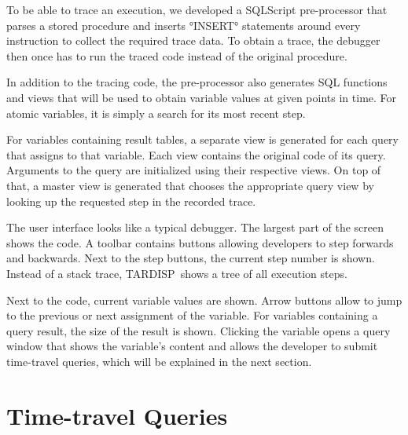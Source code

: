 \documentclass[english]{sig-alternate-05-2015}
\newcommand{\todo}[2][]{\pdfmargincomment[author={#1}]{#2}}
\newcommand{\tool}{TARDISP}
\begin{document}
To be able to trace an execution, we developed a SQLScript pre-processor that parses a stored procedure and inserts °INSERT° statements around every instruction to collect the required trace data.
To obtain a trace, the debugger then once has to run the traced code instead of the original procedure.

In addition to the tracing code, the pre-processor also generates SQL functions and views that will be used to obtain variable values at given points in time.
For atomic variables, it is simply a search for its most recent step.

For variables containing result tables, a separate view is generated for each query that assigns to that variable.
Each view contains the original code of its query.
Arguments to the query are initialized using their respective views.
On top of that, a master view is generated that chooses the appropriate query view by looking up the requested step in the recorded trace.
\todo{AT: How much detail?}

The user interface looks like a typical debugger.
The largest part of the screen shows the code.
A toolbar contains buttons allowing developers to step forwards and backwards.
Next to the step buttons, the current step number is shown.
Instead of a stack trace, \tool\ shows a tree of all execution steps.

Next to the code, current variable values are shown.
Arrow buttons allow to jump to the previous or next assignment of the variable.
For variables containing a query result, the size of the result is shown.
Clicking the variable opens a query window that shows the variable's content and allows the developer to submit time-travel queries, which will be explained in the next section.


\section{Time-travel Queries}
\label{sec:ttqueries}
\end{document}

